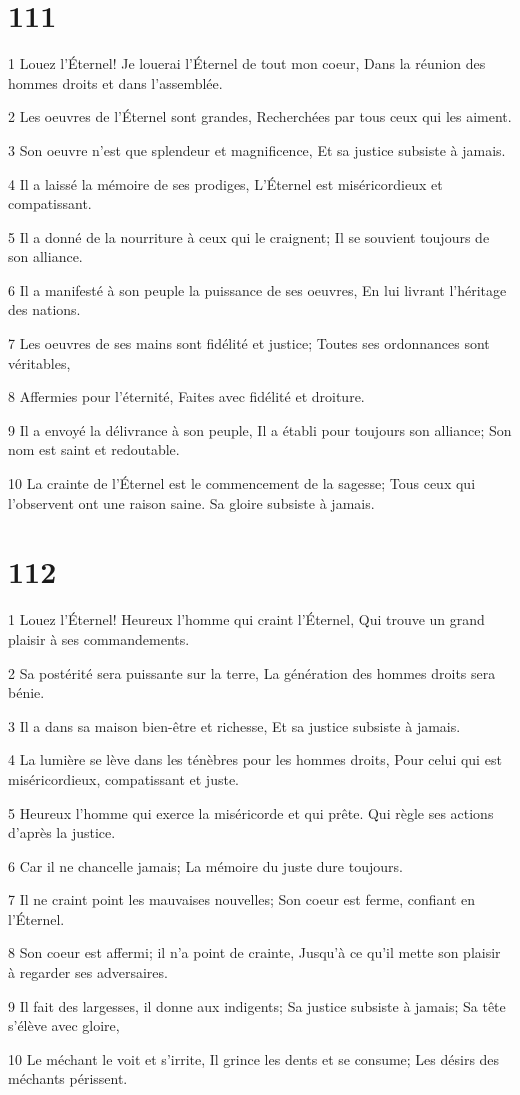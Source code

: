 \chapter{111}

\par 1 Louez l'Éternel! Je louerai l'Éternel de tout mon coeur, Dans la réunion des hommes droits et dans l'assemblée.
\par 2 Les oeuvres de l'Éternel sont grandes, Recherchées par tous ceux qui les aiment.
\par 3 Son oeuvre n'est que splendeur et magnificence, Et sa justice subsiste à jamais.
\par 4 Il a laissé la mémoire de ses prodiges, L'Éternel est miséricordieux et compatissant.
\par 5 Il a donné de la nourriture à ceux qui le craignent; Il se souvient toujours de son alliance.
\par 6 Il a manifesté à son peuple la puissance de ses oeuvres, En lui livrant l'héritage des nations.
\par 7 Les oeuvres de ses mains sont fidélité et justice; Toutes ses ordonnances sont véritables,
\par 8 Affermies pour l'éternité, Faites avec fidélité et droiture.
\par 9 Il a envoyé la délivrance à son peuple, Il a établi pour toujours son alliance; Son nom est saint et redoutable.
\par 10 La crainte de l'Éternel est le commencement de la sagesse; Tous ceux qui l'observent ont une raison saine. Sa gloire subsiste à jamais.

\chapter{112}

\par 1 Louez l'Éternel! Heureux l'homme qui craint l'Éternel, Qui trouve un grand plaisir à ses commandements.
\par 2 Sa postérité sera puissante sur la terre, La génération des hommes droits sera bénie.
\par 3 Il a dans sa maison bien-être et richesse, Et sa justice subsiste à jamais.
\par 4 La lumière se lève dans les ténèbres pour les hommes droits, Pour celui qui est miséricordieux, compatissant et juste.
\par 5 Heureux l'homme qui exerce la miséricorde et qui prête. Qui règle ses actions d'après la justice.
\par 6 Car il ne chancelle jamais; La mémoire du juste dure toujours.
\par 7 Il ne craint point les mauvaises nouvelles; Son coeur est ferme, confiant en l'Éternel.
\par 8 Son coeur est affermi; il n'a point de crainte, Jusqu'à ce qu'il mette son plaisir à regarder ses adversaires.
\par 9 Il fait des largesses, il donne aux indigents; Sa justice subsiste à jamais; Sa tête s'élève avec gloire,
\par 10 Le méchant le voit et s'irrite, Il grince les dents et se consume; Les désirs des méchants périssent.

